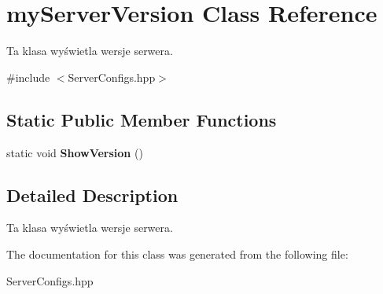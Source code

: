 \hypertarget{classmyServerVersion}{
\section{myServerVersion Class Reference}
\label{classmyServerVersion}
}


Ta klasa wyświetla wersje serwera.  




{\ttfamily \#include $<$ServerConfigs.hpp$>$}

\subsection*{Static Public Member Functions}
\begin{DoxyCompactItemize}
\item 
\hypertarget{classmyServerVersion_ae80e77daa769bb77e04e60b3edbb6662}{
static void {\bfseries ShowVersion} ()}
\label{classmyServerVersion_ae80e77daa769bb77e04e60b3edbb6662}

\end{DoxyCompactItemize}


\subsection{Detailed Description}
Ta klasa wyświetla wersje serwera. 

The documentation for this class was generated from the following file:\begin{DoxyCompactItemize}
\item 
ServerConfigs.hpp\end{DoxyCompactItemize}
